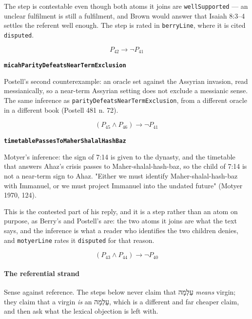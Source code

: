 \documentclass[11pt]{article}
\begin{document}
The step is contestable even though both atoms it joins are \texttt{well\allowbreak{}Supported} — an unclear fulfilment is still a fulfilment, and Brown would answer that Isaiah 8:3–4 settles the referent well enough. The step is rated in \texttt{berry\allowbreak{}Line}, where it is cited \texttt{disputed}.

\[P_{42} \rightarrow \lnot P_{41}\]
\par\medskip\noindent\textbf{\texttt{micah\allowbreak{}Parity\allowbreak{}Defeats\allowbreak{}Near\allowbreak{}Term\allowbreak{}Exclusion}}\par\nobreak\noindent
Postell's second counterexample: an oracle set against the Assyrian invasion, read messianically, so a near-term Assyrian setting does not exclude a messianic sense. The same inference as \texttt{parity\allowbreak{}Defeats\allowbreak{}Near\allowbreak{}Term\allowbreak{}Exclusion}, from a different oracle in a different book (Postell 481 n. 72).

\[(P_{45} \land P_{46}) \rightarrow \lnot P_{41}\]
\par\medskip\noindent\textbf{\texttt{timetable\allowbreak{}Passes\allowbreak{}To\allowbreak{}Maher\allowbreak{}Shalal\allowbreak{}Hash\allowbreak{}Baz}}\par\nobreak\noindent
Motyer's inference: the sign of 7:14 is given to the dynasty, and the timetable that answers Ahaz's crisis passes to Maher-shalal-hash-baz, so the child of 7:14 is not a near-term sign to Ahaz. "Either we must identify Maher-shalal-hash-baz with Immanuel, or we must project Immanuel into the undated future" (Motyer 1970, 124).

This is the contested part of his reply, and it is a step rather than an atom on purpose, as Berry's and Postell's are: the two atoms it joins are what the text says, and the inference is what a reader who identifies the two children denies, and \texttt{motyer\allowbreak{}Line} rates it \texttt{disputed} for that reason.

\[(P_{43} \land P_{44}) \rightarrow \lnot P_{40}\]
\paragraph*{The referential strand}
\leavevmode\par
Sense against reference. The steps below never claim that עַלְמָה \emph{means} virgin; they claim that a virgin \emph{is} an עַלְמָה, which is a different and far cheaper claim, and then ask what the lexical objection is left with.
\end{document}
